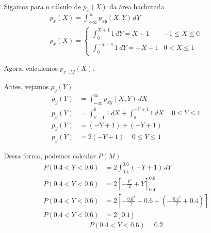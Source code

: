 \documentclass[a5paper]{report}
\begin{document}
Sigamos para o cálculo de $p_x(X)$ da área hachurada.
\begin{align*}
    p_x(X) = \int_{-\infty}^{\infty} p_{xy}(X, Y) \, dY \\
    \boxed{
    p_x(X) =
    \begin{cases}
        \int_{0}^{X + 1} 1 \, dY = X + 1 & -1 \leq X \leq 0 \\
        \int_{0}^{-X + 1} 1 \, dY = -X + 1 & 0 < X \leq 1
    \end{cases}
    }
\end{align*}

Agora, calculemos $p_{x \mid M}(X)$.

Antes, vejamos $p_y(Y)$
\begin{align*}
    p_y(Y) &= \int_{-\infty}^{\infty} p_{xy}(X, Y) \, dX \\
    p_y(Y) &= \int_{Y - 1}^{0} 1 \, dX + \int_{0}^{-Y + 1} 1 \, dX \,\,\,\,\,\,\, 0 \leq Y \leq 1 \\
    p_y(Y) &= (-Y + 1) + (-Y + 1) \\
    p_y(Y) &= 2(-Y + 1) \,\,\,\,\,\,\, 0 \leq Y \leq 1
\end{align*}

Dessa forma, podemos calcular $P(M)$.
\begin{align*}
    P(0.4 < Y < 0.6) &= 2\int_{0.4}^{0.6} (-Y + 1) \, dY \\
    P(0.4 < Y < 0.6) &= 2 \left[-\frac{Y^2}{2} + Y\right]_{0.4}^{0.6} \\
    P(0.4 < Y < 0.6) &= 2 \left[-\frac{0.6^2}{2} + 0.6 - \left(-\frac{0.4^2}{2} + 0.4\right)\right] \\
    P(0.4 < Y < 0.6) &= 2 \left[0.1\right]
\end{align*}
\begin{align*}
    P(0.4 < Y < 0.6) = 0.2
\end{align*}
\end{document}
